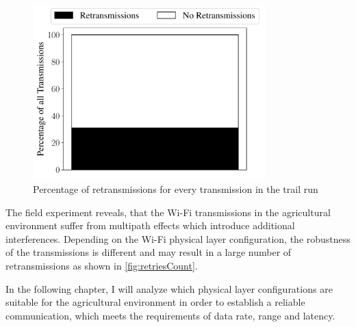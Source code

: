 \begin{figure}[H]%
	\centering
	\includegraphics[width=0.8\textwidth]{figures/All_retries}
	\caption{Percentage of retransmissions for every transmission in the trail run}
	\label{fig:retriesCount}%
\end{figure}


The field experiment reveals, that the Wi-Fi transmissions in the agricultural environment suffer from multipath effects which introduce
additional interferences. Depending on the Wi-Fi physical layer configuration, the robustness of the transmissions is different and may result in a large number of retransmissions
as shown in \autoref{fig:retriesCount}.

In the following chapter, I will analyze which physical layer
configurations are suitable for the agricultural environment in order to establish a reliable communication,
which meets the requirements of data rate, range and latency.

